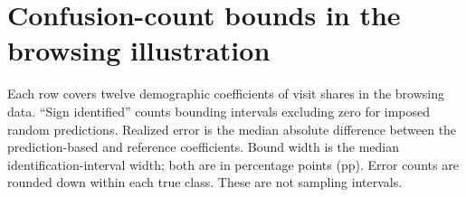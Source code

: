 \section{Confusion-count bounds in the browsing illustration}\label{app:browsing}
\begin{table}[htbp]
\centering\small
\caption{What exact confusion counts establish at 1\% imposed error in each true class}
\label{tab:browsing}

\par\smallskip
\begin{minipage}{\linewidth}\footnotesize
Each row covers twelve demographic coefficients of visit shares in the
browsing data. ``Sign identified'' counts bounding intervals excluding zero for imposed random
predictions. Realized error is the median absolute difference between the
prediction-based and reference coefficients. Bound width is the median
identification-interval width; both are in percentage points (pp). Error
counts are rounded down within each true class. These are not sampling
intervals.
\end{minipage}
\end{table}
\FloatBarrier
